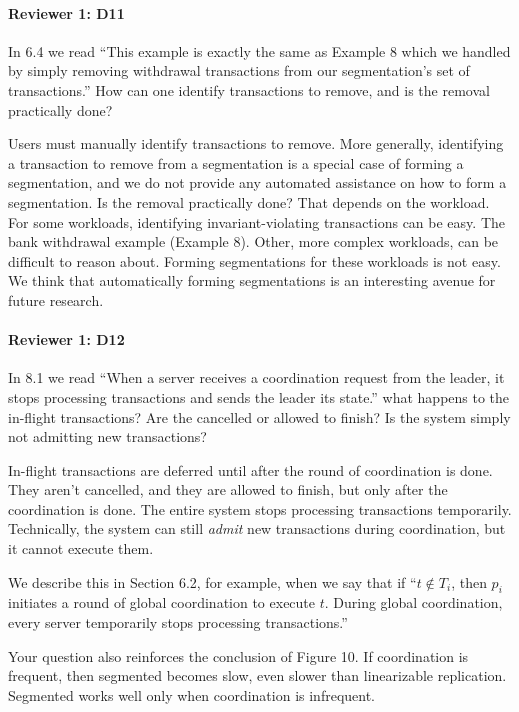 \documentclass[9pt]{article}
\begin{document}
\begin{multicols*}{2}
\paragraph{Reviewer 1: D11}
\begin{feedback}
  In 6.4 we read ``This example is exactly the same as Example 8 which we
  handled by simply removing withdrawal transactions from our segmentation's
  set of transactions.'' How can one identify transactions to remove, and is
  the removal practically done?
\end{feedback}
Users must manually identify transactions to remove. More generally,
identifying a transaction to remove from a segmentation is a special case of
forming a segmentation, and we do not provide any automated assistance on how
to form a segmentation. Is the removal practically done? That depends on the
workload. For some workloads, identifying invariant-violating transactions can
be easy. The bank withdrawal example (Example 8). Other, more complex
workloads, can be difficult to reason about. Forming segmentations for these
workloads is not easy. We think that automatically forming segmentations is an
interesting avenue for future research.

\paragraph{Reviewer 1: D12}
\begin{feedback}
  In 8.1 we read ``When a server receives a coordination request from the
  leader, it stops processing transactions and sends the leader its state.''
  what happens to the in-flight transactions? Are the cancelled or allowed to
  finish? Is the system simply not admitting new transactions?
\end{feedback}
In-flight transactions are deferred until after the round of coordination is
done. They aren't cancelled, and they are allowed to finish, but only after the
coordination is done. The entire system stops processing transactions
temporarily.  Technically, the system can still \emph{admit} new transactions
during coordination, but it cannot execute them.

We describe this in Section 6.2, for example, when we say that if ``$t \notin
T_i$, then $p_i$ initiates a round of global coordination to execute $t$.
During global coordination, every server temporarily stops processing
transactions.''

Your question also reinforces the conclusion of Figure 10. If coordination is
frequent, then segmented \invariantconfluence{} becomes slow, even slower than
linearizable replication. Segmented \invariantconfluent{} works well only when
coordination is infrequent.


\end{multicols*}
\end{document}
